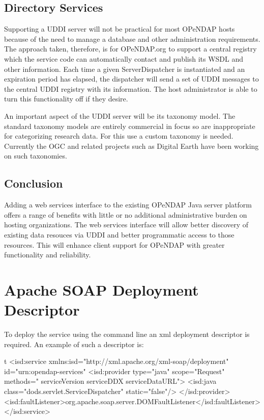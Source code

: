 \documentclass[justify]{dods-paper}
\begin{document}
\subsection{Directory Services}
Supporting a UDDI server will not be practical for most OPeNDAP hosts because of the need to manage a database and other administration requirements. The approach taken, therefore, is for OPeNDAP.org to support a central registry which the service code can automatically contact and publish its WSDL and other information. Each time a given ServerDispatcher is instantiated and an expiration period has elapsed, the dispatcher will send a set of UDDI messages to the central UDDI registry with its information. The host administrator is able to turn this functionality off if they desire.

An important aspect of the UDDI server will be its taxonomy model. The standard taxonomy models are entirely commercial in focus so are inappropriate for categorizing research data. For this use a custom taxonomy is needed. Currently the OGC and related projects such as Digital Earth have been working on such taxonomies.

\subsection{Conclusion}

Adding a web services interface to the existing OPeNDAP Java server platform offers a range of benefits with little or no additional administrative burden on hosting organizations. The web services interface will allow better discovery of existing data resouces via UDDI and better programmatic access to those resources. This will enhance client support for OPeNDAP with greater functionality and reliability.



\appendix

\section{Apache SOAP Deployment Descriptor}

To deploy the service using the command line an xml deployment descriptor is required. An example of such a descriptor is:

\begin{vcode}{t}
<isd:service xmlns:isd="http://xml.apache.org/xml-soap/deployment"
    id="urn:opendap-services"
        <isd:provider 	type="java"
            scope="Request"
            methods="	serviceVersion
                        serviceDDX
                        serviceDataURL">
            <isd:java	class="dods.servlet.ServiceDispatcher" static="false"/>
        </isd:provider>
    <isd:faultListener>org.apache.soap.server.DOMFaultListener</isd:faultListener>
</isd:service>
\end{vcode}
\end{document}
